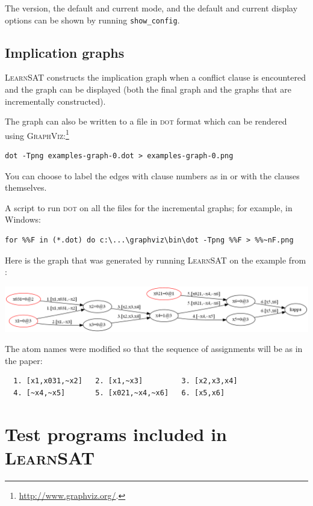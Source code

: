 \documentclass[11pt]{article}
\newcommand*{\p}[1]{\textup{\texttt{#1}}}
\newcommand*{\ls}{\textsc{LearnSAT}}
\newcommand*{\dt}{\textsc{dot}}
\begin{document}
The version, the default and current mode, and the default and current
display options can be shown by running \p{show\_config}.

\subsection{Implication graphs}\label{s.impl}

\ls{} constructs the implication graph when a conflict clause is
encountered and the graph can be displayed (both the final graph and the
graphs that are incrementally constructed). 

The graph can
also be written to a file in \dt{} format which can be rendered using
\textsc{GraphViz}:\footnote{\url{http://www.graphviz.org/}.}

\begin{verbatim}
dot -Tpng examples-graph-0.dot > examples-graph-0.png
\end{verbatim}
You can choose to label the edges with clause numbers as in \cite{mlm}
or with the clauses themselves.

A script to run \dt{} on all the files for the incremental graphs; for
example, in Windows:
\begin{verbatim}
for %%F in (*.dot) do c:\...\graphviz\bin\dot -Tpng %%F > %%~nF.png
\end{verbatim}

\pagebreak[3]

Here is the graph that was generated by running \ls{} on the example
from \cite{mlm}:
\begin{center}
\includegraphics[keepaspectratio=true,width=\textwidth]{graph}
\end{center}
The atom names were modified so that the sequence of assignments
will be as in the paper:
\begin{verbatim}
  1. [x1,x031,~x2]   2. [x1,~x3]         3. [x2,x3,x4]
  4. [~x4,~x5]       5. [x021,~x4,~x6]   6. [x5,x6]
\end{verbatim}

\section{Test programs included in \ls{}}
\end{document}
